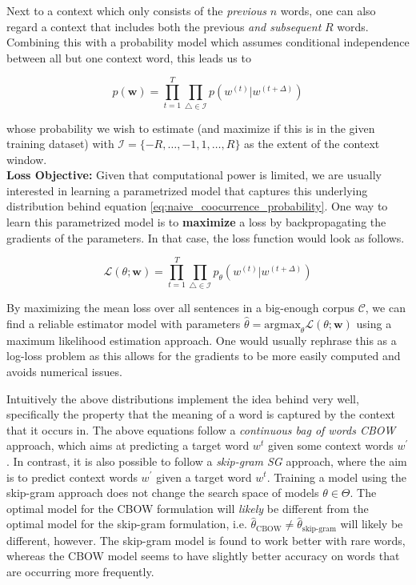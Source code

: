 \documentclass[a4paper,12pt,oneside,openright]{report}
\begin{document}
Next to a context which only consists of the \textit{previous} $n$ words, one can also regard a context that includes both the previous \textit{and subsequent} $R$ words. 
Combining this with a probability model which assumes conditional independence between all but one context word, this leads us to

\begin{equation}
p(\mathbf{w})=\prod_{t=1}^{T} \prod_{\triangle \in \mathcal{I} } p\left( w^{(t)} | w^{(t +\Delta)}\right)
\label{eq:naive_coocurrence_probability}
\end{equation}

whose probability we wish to estimate (and maximize if this is in the given training dataset) with $\mathcal{I}=\{-R, \ldots,-1,1, \ldots, R\}$ as the extent of the context window. \\

\textbf{Loss Objective:} Given that computational power is limited, we are usually interested in learning a parametrized model that captures this underlying distribution behind equation \eqref{eq:naive_coocurrence_probability}.
One way to learn this parametrized model is to \textbf{maximize} a loss by backpropagating the gradients of the parameters.
In that case, the loss function would look as follows.


\begin{equation}
\mathcal{L}(\theta ; \mathbf{w})= \prod_{t=1}^{T} \prod_{\triangle \in \mathcal{I}} p_{\theta}\left(w^{(t)} | w^{(t +\Delta)}\right)
\end{equation}{\label{eq:basic_equation_log_maximization}}

By maximizing the mean loss over all sentences in a big-enough corpus $\mathcal{C}$, we can find a reliable estimator model with parameters $\hat{\theta} = \text{argmax}_\theta \mathcal{L}(\theta ; \mathbf{w})$ using a maximum likelihood estimation approach.
One would usually rephrase this as a log-loss problem as this allows for the gradients to be more easily computed and avoids numerical issues.

Intuitively the above distributions implement the idea behind \cite{harris54} very well, specifically the property that the meaning of a word is captured by the context that it occurs in.
The above equations follow a \textit{continuous bag of words CBOW} approach, which aims at predicting a target word $w^t$ given some context words $w^{\prime}$.
In contrast, it is also possible to follow a \textit{skip-gram SG} approach, where the aim is to predict context words $w^{\prime}$ given a target word $w^t$.
Training a model using the skip-gram approach does not change the search space of models $\theta \in \Theta$.
The optimal model for the CBOW formulation will \textit{likely} be different from the optimal model for the skip-gram formulation, i.e. $\hat{\theta}_{\text{CBOW}} \neq \hat{\theta}_{\text{skip-gram}}$ will likely be different, however.
The skip-gram model is found to work better with rare words, whereas the CBOW model seems to have slightly better accuracy on words that are occurring more frequently.
\end{document}
